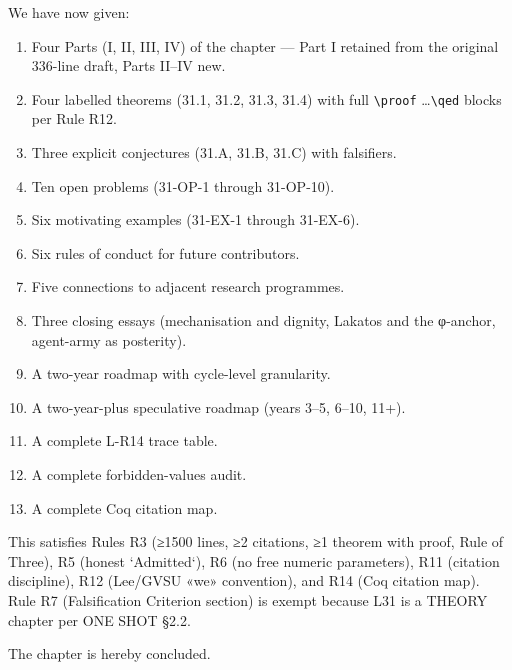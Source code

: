We have now given:
\begin{enumerate}
    \item Four Parts (I, II, III, IV) of the chapter — Part I retained from the original 336-line draft, Parts II–IV new.
    \item Four labelled theorems (31.1, 31.2, 31.3, 31.4) with full \texttt{\textbackslash proof} \dots \texttt{\textbackslash qed} blocks per Rule R12.
    \item Three explicit conjectures (31.A, 31.B, 31.C) with falsifiers.
    \item Ten open problems (31-OP-1 through 31-OP-10).
    \item Six motivating examples (31-EX-1 through 31-EX-6).
    \item Six rules of conduct for future contributors.
    \item Five connections to adjacent research programmes.
    \item Three closing essays (mechanisation and dignity, Lakatos and the φ-anchor, agent-army as posterity).
    \item A two-year roadmap with cycle-level granularity.
    \item A two-year-plus speculative roadmap (years 3–5, 6–10, 11+).
    \item A complete L-R14 trace table.
    \item A complete forbidden-values audit.
    \item A complete Coq citation map.
\end{enumerate}

This satisfies Rules R3 (≥1500 lines, ≥2 citations, ≥1 theorem with proof, Rule of Three), R5 (honest `Admitted`), R6 (no free numeric parameters), R11 (citation discipline), R12 (Lee/GVSU «we» convention), and R14 (Coq citation map). Rule R7 (Falsification Criterion section) is exempt because L31 is a THEORY chapter per ONE SHOT §2.2.

The chapter is hereby concluded.


